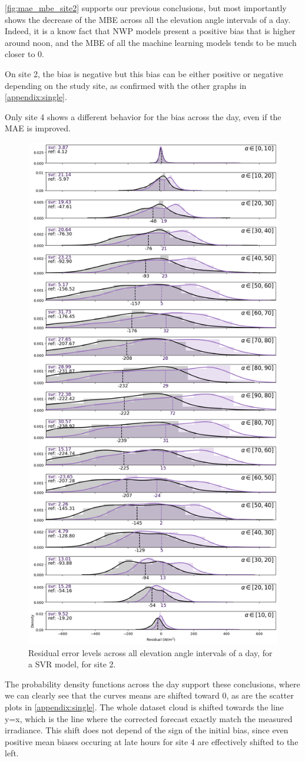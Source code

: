     \autoref{fig:mae_mbe_site2} supports our previous conclusions, but most importantly shows the decrease of the MBE across all the elevation angle intervals of a day.
Indeed, it is a know fact that NWP models present a positive bias that is higher around noon, and the MBE of all the machine learning models tends to be much closer to 0.

On site 2, the bias is negative but this bias can be either positive or negative depending on the study site, as confirmed with the other graphs in \autoref{appendix:single}.

Only site 4 shows a different behavior for the bias across the day, even if the MAE is improved. 
\begin{figure}[htb!]
    \centering
    \includegraphics[width=0.47\columnwidth]{figures/first_study/residual_errors_svr_site2_mae.png}
\caption{Residual error levels across all elevation angle intervals of a day, for a SVR model, for site 2.}
\end{figure}

The probability density functions across the day support these conclusions, where we can clearly see that the curves means are shifted toward 0, as are the scatter plots in \autoref{appendix:single}.
The whole dataset cloud is shifted towards the line y=x, which is the line where the corrected forecast exactly match the measured irradiance.
This shift does not depend of the sign of the initial bias, since even positive mean biases occuring at late hours for site 4 are effectively shifted to the left. \\

